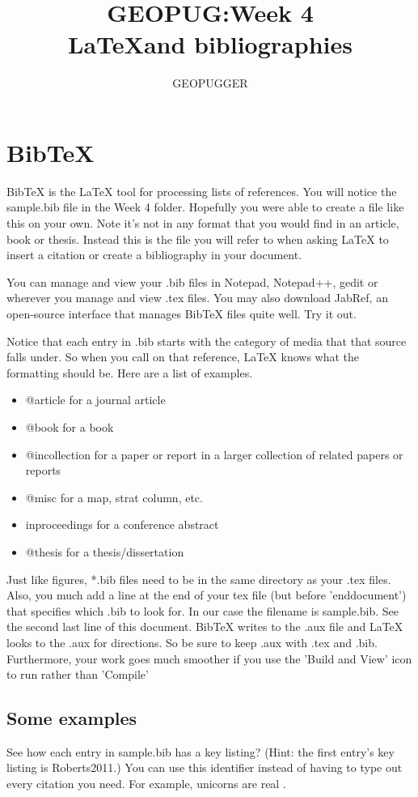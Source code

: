 \documentclass[12pt]{article} %
\date{} %
\title{GEOPUG:Week 4\\ \LaTeX and bibliographies}
\author{GEOPUGGER}
\begin{document}
\maketitle
\section*{BibTeX}
BibTeX is the LaTeX tool for processing lists of references.  You will notice the sample.bib file in the Week 4 folder.  Hopefully you were able to create a file like this on your own.  Note it's not in any format that you would find in an article, book or thesis.  Instead this is the file you will refer to when asking LaTeX to insert a citation or create a bibliography in your document.

You can manage and view your .bib files in Notepad, Notepad++, gedit or wherever you manage and view .tex files.  You may also download JabRef, an open-source interface that manages BibTeX files quite well.  Try it out.

Notice that each entry in .bib starts with the category of media that that source falls under.  So when you call on that reference, LaTeX knows what the formatting should be.  Here are a list of examples.

\begin{itemize} %
\item @article for a journal article
\item @book for a book
\item @incollection for a paper or report in a larger collection of related papers or reports
\item @misc for a map, strat column, etc.
\item inproceedings for a conference abstract
\item @thesis for a thesis/dissertation
\end{itemize}

Just like figures, *.bib files need to be in the same directory as your .tex files.  Also, you much add a line at the end of your tex file (but before 'enddocument') that specifies which .bib to look for.  In our case the filename is sample.bib.  See the second last line of this document.  BibTeX writes to the .aux file and LaTeX looks to the .aux for directions.  So be sure to keep .aux with .tex and .bib.  Furthermore, your work goes much smoother if you use the 'Build and View' icon to run rather than 'Compile'

\subsection*{Some examples}
See how each entry in sample.bib has a key listing?  (Hint: the first entry's key listing is Roberts2011.) You can use this identifier instead of having to type out every citation you need.  For example, unicorns are real \citep{Roberts2011}.\\
\end{document}
